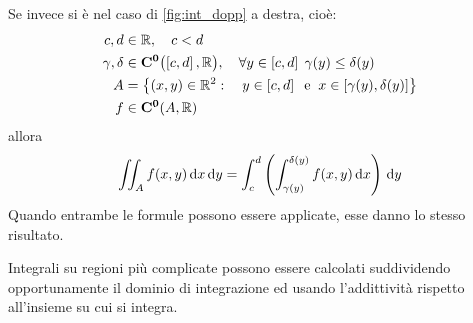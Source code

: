 \vspace*{\baselineskip}
\noindent Se invece si è nel caso di \autoref{fig:int_dopp} a destra, cioè:
\begin{align*}
	c, d &\in \mathbb{R}, \quad c < d\\
	\gamma, \delta &\in \mathbf{C^{0}}\bigl( \left[c,d\right], \mathbb{R} \bigr), \quad \forall y \in \left[c,d\right]\; \gamma(y) \leq \delta(y)\\
	A &= \left\{(x,y) \in \mathbb{R}^2: \quad y \in \left[c,d\right] \;\; \text{e} \;\; x \in \left[\gamma(y),\delta(y)\right]\right\}\\
	f &\in \mathbf{C^{0}}(A, \mathbb{R})\\
\end{align*}
allora
\[\iint_A f(x,y) \,\mathrm{d}{x} \,\mathrm{d}{y} = \int_c^d \left( \int_{\gamma(y)}^{\delta(y)} f(x,y) \,\mathrm{d}{x} \right) \,\mathrm{d}{y}\]
Quando entrambe le formule possono essere applicate, esse danno lo stesso risultato.
\begin{note}
	Integrali su regioni più complicate possono essere calcolati suddividendo opportunamente il dominio di integrazione ed usando l'addittività rispetto all'insieme su cui si integra.	
\end{note}

\newpage
